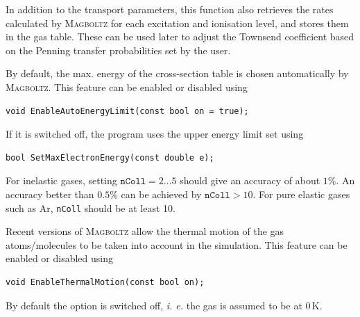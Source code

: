 In addition to the transport parameters, this function also 
retrieves the rates calculated by \textsc{Magboltz} for each excitation and 
ionisation level, and stores them in the gas table. These can be used 
later to adjust the Townsend coefficient based on the Penning transfer 
probabilities set by the user.

By default, the max. energy of the cross-section table  
is chosen automatically by \textsc{Magboltz}. This feature can be 
enabled or disabled using
\begin{lstlisting}
void EnableAutoEnergyLimit(const bool on = true);
\end{lstlisting} 
If it is switched off, the program uses the upper energy limit set using 
\begin{lstlisting}
bool SetMaxElectronEnergy(const double e);
\end{lstlisting}

For inelastic gases, setting \(\texttt{nColl} = 2 \dots 5\)
should give an accuracy of about \(1\%\). 
An accuracy better than \(0.5\%\) can be achieved by 
\(\texttt{nColl} > 10\). 
For pure elastic gases such as Ar, \texttt{nColl} should 
be at least 10.  

Recent versions of \textsc{Magboltz} allow the thermal motion of the gas 
atoms/molecules to be taken into account in the simulation. 
This feature can be enabled or disabled using
\begin{lstlisting}
void EnableThermalMotion(const bool on);
\end{lstlisting} 
By default the option is switched off, \textit{i. e.} the gas 
is assumed to be at 0\,K. 

